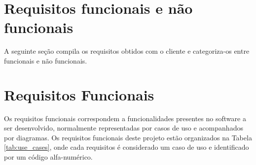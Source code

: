 \section{Requisitos funcionais e não funcionais}

A seguinte seção compila os requisitos obtidos com o cliente e categoriza-os entre funcionais e não funcionais.

\section{Requisitos Funcionais}

Os requisitos funcionais correspondem a funcionalidades presentes no software a ser desenvolvido, normalmente representadas por casos de uso e acompanhados por diagramas. Os requisitos funcionais deste projeto estão organizados na Tabela \ref{tab:use_cases}, onde cada requisitos é considerado um caso de uso e identificado por um código alfa-numérico.

